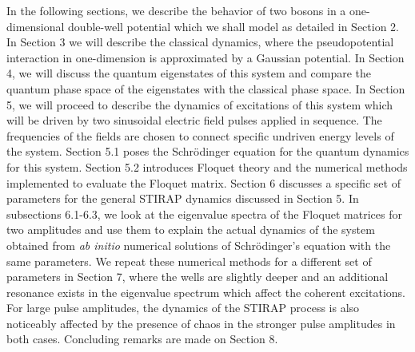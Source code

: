 \documentclass{article}
\begin{document}
In the following sections, we describe the behavior of two bosons in a one-dimensional double-well potential which we shall model as detailed in Section 2. In Section 3 we will describe the classical dynamics, where the pseudopotential interaction in one-dimension is approximated by a Gaussian potential. In Section 4, we will discuss the quantum eigenstates of this system and compare the quantum phase space of the eigenstates with the classical phase space. In Section 5, we will proceed to describe the dynamics of excitations of this system which will be driven by two sinusoidal electric field pulses applied in sequence. The frequencies of the fields are chosen to connect specific undriven energy levels of the system.  Section 5.1 poses the Schr\"odinger equation for the quantum dynamics for this system. Section 5.2 introduces Floquet theory and the numerical methods implemented to evaluate the Floquet matrix. Section 6 discusses a specific set of parameters for the general STIRAP dynamics discussed in Section 5. In subsections 6.1-6.3, we look at the eigenvalue spectra of the Floquet matrices for two amplitudes and use them to explain the actual dynamics of the system obtained from \textit{ab initio} numerical solutions of Schr\"odinger's equation with the same parameters. We repeat these numerical methods for a different set of parameters in Section 7, where the wells are slightly deeper and an additional resonance exists in the eigenvalue spectrum which affect the coherent excitations. For large pulse amplitudes, the dynamics of the STIRAP process is also noticeably affected by the presence of chaos in the stronger pulse amplitudes in both cases. Concluding remarks are made on Section 8.
%
\end{document}
